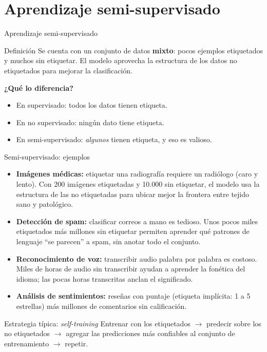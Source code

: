 \documentclass[aspectratio=169]{beamer}
\begin{document}
\section{Aprendizaje semi-supervisado}

\begin{frame}{Aprendizaje semi-supervisado}
  \begin{block}{Definición}
    Se cuenta con un conjunto de datos \textbf{mixto}: pocos ejemplos etiquetados y muchos sin etiquetar. El modelo aprovecha la estructura de los datos no etiquetados para mejorar la clasificación.
  \end{block}
  \bigskip
  \textbf{¿Qué lo diferencia?}
  \begin{itemize}
    \item En supervisado: todos los datos tienen etiqueta.
    \item En no supervisado: ningún dato tiene etiqueta.
    \item En semi-supervisado: \textit{algunos} tienen etiqueta, y eso es valioso.
  \end{itemize}
\end{frame}

\begin{frame}{Semi-supervisado: ejemplos}
  \small
  \begin{itemize}
    \item \textbf{Imágenes médicas:} etiquetar una radiografía requiere un radiólogo (caro y lento). Con 200 imágenes etiquetadas y 10.000 sin etiquetar, el modelo usa la estructura de las no etiquetadas para ubicar mejor la frontera entre tejido sano y patológico.
    \item \textbf{Detección de spam:} clasificar correos a mano es tedioso. Unos pocos miles etiquetados más millones sin etiquetar permiten aprender qué patrones de lenguaje ``se parecen'' a spam, sin anotar todo el conjunto.
    \item \textbf{Reconocimiento de voz:} transcribir audio palabra por palabra es costoso. Miles de horas de audio sin transcribir ayudan a aprender la fonética del idioma; las pocas horas transcritas anclan el significado.
    \item \textbf{Análisis de sentimientos:} reseñas con puntaje (etiqueta implícita: 1 a 5 estrellas) más millones de comentarios sin calificación.
  \end{itemize}
  \begin{exampleblock}{Estrategia típica: \textit{self-training}}
    Entrenar con los etiquetados $\rightarrow$ predecir sobre los no etiquetados $\rightarrow$ agregar las predicciones más confiables al conjunto de entrenamiento $\rightarrow$ repetir.
  \end{exampleblock}
\end{frame}
\end{document}
